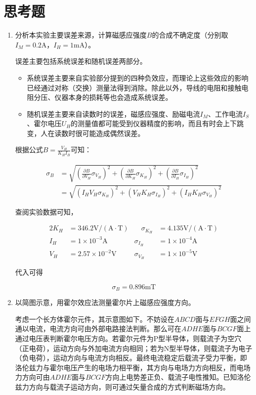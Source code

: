 \documentclass[12pt]{article}
\begin{document}
\section{思考题}
\begin{enumerate}
    \item {\kaishu 分析本实验主要误差来源，计算磁感应强度$B$的合成不确定度（分别取$I_M=0.2\mathrm{A}$，$I_H=1\mathrm{mA}$）。}
    
    误差主要包括系统误差和随机误差两部分。

    \begin{itemize}
        \item 系统误差主要来自实验部分提到的四种负效应，而理论上这些效应的影响已经通过对称（交换）测量法得到消除。除此以外，导线的电阻和接触电阻分压、仪器本身的损耗等也会造成系统误差。
        \item 随机误差主要来自读数时的误差，磁感应强度、励磁电流$I_M$、工作电流$I_S$、霍尔电压$U_H$的测量值都可能受到仪器精度的影响，而且有时会上下跳变，人在读数时很可能造成偶然误差。
    \end{itemize}

    根据公式$B=\frac{V_H}{K_HI_B}$可知：

    \[
        \begin{aligned}
            \sigma_B &= \sqrt{(\frac{\partial B}{\partial V_H}\sigma_{V_H})^2+(\frac{\partial B}{\partial K_H}\sigma_{K_H})^2+(\frac{\partial B}{\partial I_H}\sigma_{I_H})^2} \\
            &= \sqrt{(I_HV_H\sigma_{K_H})^2+(V_HK_H\sigma_{I_H})^2+(I_HK_H\sigma_{V_H})^2}
        \end{aligned}
    \]
    
    查阅实验数据可知，

    \begin{alignat*}{2}
        K_H&=346.2\mathrm{V/(A\cdot T)} &\quad \sigma_{K_H}&=4.135\mathrm{V/(A\cdot T)} \\
        I_H&=1\times10^{-3}\mathrm{A} & \sigma_{I_H}&=1\times10^{-4}\mathrm{A} \\
        V_H&=2.57\times10^{-2}\mathrm{V} & \sigma_{V_H}&=1\times10^{-5}\mathrm{V}
    \end{alignat*}

    代入可得

    \[
        \sigma_B=0.896\mathrm{mT}
    \]

    \item {\kaishu 以简图示意，用霍尔效应法测量霍尔片上磁感应强度方向。}
    
    考虑一个长方体霍尔元件，其示意图如下。不妨设在$ ABCD $面与$ EFGH $面之间通以电流，电流方向可由外部电路接法判断。那么可在$ ADHE $面与$ BCGF $面上通过电压表判断霍尔电压方向。若霍尔元件为P型半导体，则载流子为空穴（正电荷），运动方向与外加电流方向相同；若为N型半导体，则载流子为电子（负电荷），运动方向与电流方向相反。最终电流稳定后载流子受力平衡，即洛伦兹力与霍尔电压产生的电场力相平衡，其方向与电场力方向相反，而电场力方向可由$ ADHE $面与$ BCGF $方向上电势差正负、载流子电性推知。已知洛伦兹力方向与载流子运动方向，则可通过矢量合成的方式判断磁场方向。


\end{enumerate}
\end{document}
